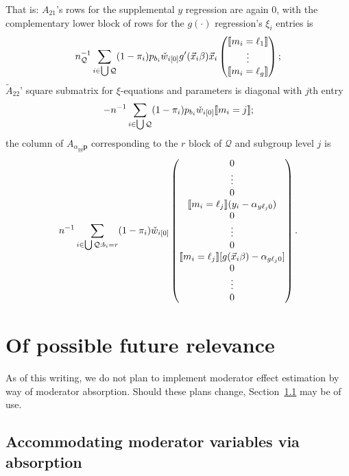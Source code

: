 \documentclass{article}
\DeclarePairedDelimiter{\indicator}{\llbracket}{\rrbracket}
\newcommand{\owt}[1][{[z_{i}]}]{\ensuremath{\check{w}_{i#1}}}
\begin{document}
That is: $A_{21}$'s rows for the supplemental $y$ regression are again
0, with the complementary lower block of rows for the $g(\cdot)$
regression's $\xi_{i}$ entries is 
\begin{equation*}
      n_{\mathcal{Q}}^{-1}\sum_{i\in \bigcup\mathcal{Q} }
  (1-\pi_{i}){p}_{b_{{i}}}\owt[{[0]}] g'(\vec{x}_{i}{\beta})
  \vec{x}_{i}
  \begin{pmatrix}
    \indicator{m_{i}=\ell_{1}}\\ \vdots \\ \indicator{m_{i}=\ell_{g}} \\
  \end{pmatrix};
\end{equation*}
$\tilde{A}_{22}$' square submatrix for $\xi$-equations and parameters
is diagonal with $j$th entry
\begin{equation*}
  -n^{-1}\sum_{i\in \bigcup\mathcal{Q} }
  (1-\pi_{i}){p}_{b_{{i}}}\owt[{[0]}]\indicator{m_{i}=j};
\end{equation*}
the column of $A_{\alpha_{yg}\mathbf{p}}$ corresponding to the $r$
block of $\mathcal{Q}$ and subgroup level $j$ is
\begin{equation*}
  n^{-1}\sum_{i\in \bigcup\mathcal{Q}: b_{i}=r }
  (1-\pi_{i}) \owt[{[0]}]
  \begin{pmatrix}
    0\\ \vdots\\ 0 \\
\indicator{m_{i}=\ell_{j}}(y_{i}-\alpha_{y\ell_{j}0})\\
  0\\ \vdots\\ 0 \\ 
\indicator{m_{i}=\ell_{j}}[g(\vec{x}_{i}\beta) -
    \alpha_{g\ell_{j}0}]\\
 0\\ \vdots\\ 0 \\ 
\end{pmatrix}.
\end{equation*}

\section{Of possible future relevance}

As of this writing, we do not plan to implement moderator effect estimation by way of moderator absorption.  Should these plans change, Section~\ref{sec:accomm-moder-vari} may be of use.
\subsection{Accommodating moderator variables via absorption}
\label{sec:accomm-moder-vari}
\end{document}

